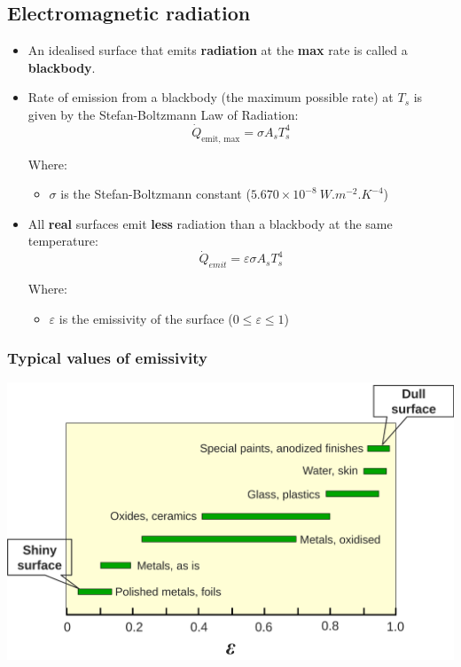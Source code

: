 \documentclass[11pt]{article}
\begin{document}
 \newpage

\subsection{Electromagnetic radiation}
\label{sec:org229949e}
\begin{itemize}
\item An idealised surface that emits \textbf{radiation} at the \textbf{max} rate is called a \textbf{blackbody}.
\item Rate of emission from a blackbody (the maximum possible rate) at \(T_s\) is given by the Stefan-Boltzmann Law of Radiation:
\[\dot{Q}_{\text{emit, max}} = \sigma A_s T_s^4\]

Where:
\begin{itemize}
\item \(\sigma\) is the Stefan-Boltzmann constant (\(5.670 \times 10^{-8} \ \unit{W.m^{-2}.K^{-4}}\))
\end{itemize}

\item All \textbf{real} surfaces emit \textbf{less} radiation than a blackbody at the same temperature:
\[\dot{Q}_{emit} = \varepsilon \sigma A_s T_s^4\]

Where:
\begin{itemize}
\item \(\varepsilon\) is the emissivity of the surface (\(0 \le \varepsilon \le 1\))
\end{itemize}
\end{itemize}

\subsubsection{Typical values of emissivity}
\label{sec:orgbbf25dd}
\begin{center}
\includegraphics[width=.9\linewidth]{./images/typical-values-of-emissivity.png}
\end{center}
\end{document}
